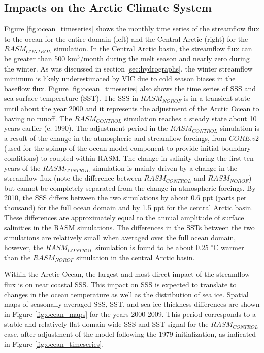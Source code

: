 \documentclass[jgrga, draft]{agutex}
\begin{document}
\begin{article}
\subsection{Impacts on the Arctic Climate System}
\label{sec:ocean}
Figure \ref{fig:ocean_timeseries} shows the monthly time series of the streamflow flux to the ocean for the entire domain (left) and the Central Arctic (right) for the $RASM_{CONTROL}$ simulation.
In the Central Arctic basin, the streamflow flux can be greater than 500 km$^3$/month during the melt season and nearly zero during the winter.
As was discussed in section \ref{sec:hydrographs}, the winter streamflow minimum is likely underestimated by VIC due to cold season biases in the baseflow flux.
Figure \ref{fig:ocean_timeseries} also shows the time series of SSS and sea surface temperature (SST).
The SSS in $RASM_{NOROF}$ is in a transient state until about the year 2000 and it represents the adjustment of the Arctic Ocean to having no runoff.
The $RASM_{CONTROL}$ simulation reaches a steady state about 10 years earlier (c. 1990).
The adjustment period in the $RASM_{CONTROL}$ simulation is a result of the change in the atmospheric and streamflow forcings, from $CORE.v2$ (used for the spinup of the ocean model component to provide initial boundary conditions) to coupled within RASM.
The change in salinity during the first ten years of the $RASM_{CONTROL}$ simulation is mainly driven by a change in the streamflow flux (note the difference between $RASM_{CONTROL}$ and $RASM_{NOROF}$) but cannot be completely separated from the change in atmospheric forcings.
By 2010, the SSS differs between the two simulations by about 0.6 ppt (parts per thousand) for the full ocean domain and by 1.5 ppt for the central Arctic basin.
These differences are approximately equal to the annual amplitude of surface salinities in the RASM simulations.
The differences in the SSTs between the two simulations are relatively small when averaged over the full ocean domain, however, the $RASM_{CONTROL}$ simulation is found to be about 0.25 $^{\circ}$C warmer than the $RASM_{NOROF}$ simulation in the central Arctic basin.

Within the Arctic Ocean, the largest and most direct impact of the streamflow flux is on near coastal SSS.
This impact on SSS is expected to translate to changes in the ocean temperature as well as the distribution of sea ice.
Spatial maps of seasonally averaged SSS, SST, and sea ice thickness differences are shown in Figure \ref{fig:ocean_maps} for the years 2000-2009. This period corresponds to a stable and relatively flat domain-wide SSS and SST signal for the $RASM_{CONTROL}$ case, after adjustment of the model following the 1979 initialization, as indicated in Figure \ref{fig:ocean_timeseries}.


\end{article}
\end{document}

